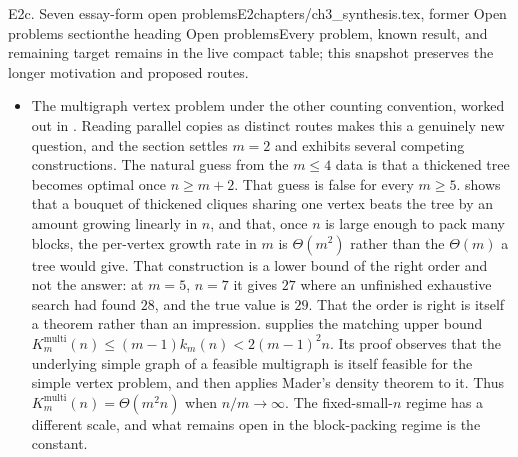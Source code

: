 \begin{offcut}{E2c. Seven essay-form open problems}{E2}{chapters/ch3\_synthesis.tex, former Open problems section}{the heading Open problems}{Every problem, known result, and remaining target remains in the live compact table; this snapshot preserves the longer motivation and proposed routes.}
\begin{itemize}
    \item The multigraph vertex problem under the other counting convention, worked out in . Reading parallel copies as distinct routes makes this a genuinely new question, and the section settles $m = 2$ and exhibits several competing constructions. The natural guess from the $m \le 4$ data is that a thickened tree becomes optimal once $n \ge m+2$. That guess is false for every $m \ge 5$.  shows that a bouquet of thickened cliques sharing one vertex beats the tree by an amount growing linearly in $n$, and that, once $n$ is large enough to pack many blocks, the per-vertex growth rate in $m$ is $\Theta(m^2)$ rather than the $\Theta(m)$ a tree would give. That construction is a lower bound of the right order and not the answer: at $m = 5$, $n = 7$ it gives $27$ where an unfinished exhaustive search had found $28$, and the true value is $29$. That the order is right is itself a theorem rather than an impression.  supplies the matching upper bound $K_m^{\mathrm{multi}}(n) \le (m-1)k_m(n) < 2(m-1)^2 n$. Its proof observes that the underlying simple graph of a feasible multigraph is itself feasible for the simple vertex problem, and then applies Mader's density theorem to it. Thus $K_m^{\mathrm{multi}}(n) = \Theta(m^2 n)$ when $n/m\to\infty$. The fixed-small-$n$ regime has a different scale, and what remains open in the block-packing regime is the constant.


\end{itemize}
\end{offcut}
